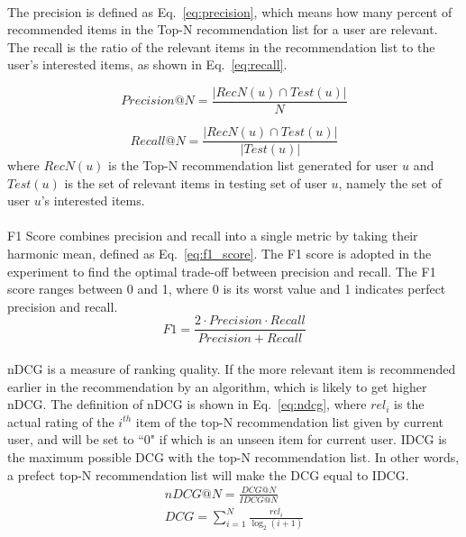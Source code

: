 \documentclass[a4paper,12pt]{report}
\begin{document}
\paragraph{}
The precision is defined as Eq.~\eqref{eq:precision}, which means how many percent of recommended items in the Top-N recommendation list for a user are relevant. The recall is the ratio of the relevant items in the recommendation list to the user's interested items, as shown in Eq.~\eqref{eq:recall}.

\begin{equation}
    Precision@N = \frac{|RecN(u)\cap Test(u)|}{N}
    \label{eq:precision}
\end{equation}

\begin{equation}
    Recall@N = \frac{|RecN(u) \cap Test(u)|}{|Test(u)|}
    \label{eq:recall}
\end{equation}
where $RecN(u)$ is the Top-N recommendation list generated for user $u$ and $Test(u)$ is the set of relevant items in testing set of user $u$, namely the set of user $u$'s interested items.

\paragraph{}
F1 Score combines precision and recall into a single metric by taking their harmonic mean, defined as Eq.~\eqref{eq:f1_score}. The F1 score is adopted in the experiment to find the optimal trade-off between precision and recall. The F1 score ranges between 0 and 1, where 0 is its worst value and 1 indicates perfect precision and recall.
\begin{equation}
    F1 = \frac{2 \cdot Precision \cdot Recall}{Precision + Recall}
    \label{eq:f1_score}
\end{equation}

\paragraph{}
nDCG is a measure of ranking quality. If the more relevant item is recommended earlier in the recommendation by an algorithm, which is likely to get higher nDCG. The definition of nDCG is shown in Eq.~\eqref{eq:ndcg}, where $rel_i$ is the actual rating of the $i^{th}$ item of the top-N recommendation list given by current user, and will be set to ``0" if which is an unseen item for current user. IDCG is the maximum possible DCG with the top-N recommendation list. In other words, a prefect top-N recommendation list will make the DCG equal to IDCG.
\begin{equation}
    \begin{aligned}
        nDCG@N = \frac{DCG@N}{IDCG@N} \\
        DCG = \sum_{i=1}^{N}\frac{rel_i}{\log_2(i+1)}
    \end{aligned}
    \label{eq:ndcg}
\end{equation}
\end{document}
